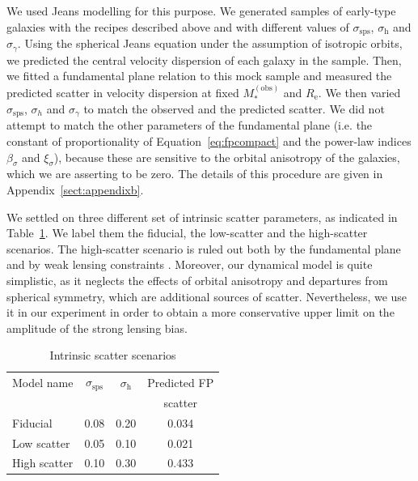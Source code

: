 \documentclass{aa}
\def\reff{R_{\mathrm{e}}}
\def\mobs{M_*^{(\mathrm{obs})}}
\def\Tref#1{Table~\ref{#1}\xspace}
\def\Eref#1{Equation~\ref{#1}\xspace}
\begin{document}
We used Jeans modelling for this purpose.
We generated samples of early-type galaxies with the recipes described above and with different values of $\sigma_{\mathrm{sps}}$, $\sigma_\mathrm{h}$ and $\sigma_\gamma$.
Using the spherical Jeans equation under the assumption of isotropic orbits, we predicted the central velocity dispersion of each galaxy in the sample. Then, we fitted a fundamental plane relation to this mock sample and measured the predicted scatter in velocity dispersion at fixed $\mobs$ and $\reff$.
We then varied $\sigma_{\mathrm{sps}}$, $\sigma_h$ and $\sigma_\gamma$ to match the observed and the predicted scatter.
We did not attempt to match the other parameters of the fundamental plane (i.e. the constant of proportionality of \Eref{eq:fpcompact} and the power-law indices $\beta_{\sigma}$ and $\xi_{\sigma}$), because these are sensitive to the orbital anisotropy of the galaxies, which we are asserting to be zero.
The details of this procedure are given in Appendix~\ref{sect:appendixb}.

We settled on three different set of intrinsic scatter parameters, as indicated in \Tref{tab:scatter}. We label them the fiducial, the low-scatter and the high-scatter scenarios.
The high-scatter scenario is ruled out both by the fundamental plane and by weak lensing constraints \citep{Son++22}. 
Moreover, our dynamical model is quite simplistic, as it neglects the effects of orbital anisotropy and departures from spherical symmetry, which are additional sources of scatter. 
Nevertheless, we use it in our experiment in order to obtain a more conservative upper limit on the amplitude of the strong lensing bias.
\begin{table}
\caption{Intrinsic scatter scenarios}
\label{tab:scatter}
\begin{tabular}{lccc}
\hline
\hline
Model name & $\sigma_{\mathrm{sps}}$ & $\sigma_{\mathrm{h}}$ & Predicted FP \\
 & & & scatter \\
\hline
Fiducial & 0.08 & 0.20 & 0.034 \\
Low scatter & 0.05 & 0.10 & 0.021 \\
High scatter & 0.10 & 0.30 & 0.433 \\
\end{tabular}
\end{table}
\end{document}
